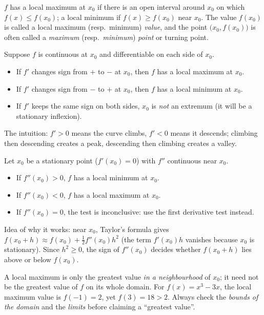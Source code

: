 \documentclass[11pt]{article}
\newcommand{\cle}[1]{{\popxbold\color{popdark}#1}}
\begin{document}
\begin{definition}
$f$ has a \cle{local maximum} at $x_0$ if there is an open interval around $x_0$ on which $f(x) \le f(x_0)$; a \cle{local minimum} if $f(x) \ge f(x_0)$ near $x_0$. The value $f(x_0)$ is called a local maximum (resp.\ minimum) \emph{value}, and the point $\bigl(x_0, f(x_0)\bigr)$ is often called a \emph{maximum} (resp.\ \emph{minimum}) \emph{point} or \cle{turning point}.
\end{definition}

\begin{propriete}
Suppose $f$ is continuous at $x_0$ and differentiable on each side of $x_0$.
\begin{itemize}
\item If $f'$ changes sign from $+$ to $-$ at $x_0$, then $f$ has a \cle{local maximum} at $x_0$.
\item If $f'$ changes sign from $-$ to $+$ at $x_0$, then $f$ has a \cle{local minimum} at $x_0$.
\item If $f'$ keeps the same sign on both sides, $x_0$ is \emph{not} an extremum (it will be a stationary inflexion).
\end{itemize}
The intuition: $f'>0$ means the curve climbs, $f'<0$ means it descends; climbing then descending creates a peak, descending then climbing creates a valley.
\end{propriete}

\begin{propriete}
Let $x_0$ be a stationary point ($f'(x_0)=0$) with $f''$ continuous near $x_0$.
\begin{itemize}
\item If $f''(x_0) > 0$, $f$ has a \cle{local minimum} at $x_0$.
\item If $f''(x_0) < 0$, $f$ has a \cle{local maximum} at $x_0$.
\item If $f''(x_0) = 0$, the test is \cle{inconclusive}: use the first derivative test instead.
\end{itemize}
Idea of why it works: near $x_0$, Taylor's formula gives $f(x_0+h) \approx f(x_0) + \tfrac{1}{2}f''(x_0)h^2$ (the term $f'(x_0)h$ vanishes because $x_0$ is stationary). Since $h^2 \ge 0$, the sign of $f''(x_0)$ decides whether $f(x_0+h)$ lies above or below $f(x_0)$.
\end{propriete}

\begin{attention}
A local maximum is only the greatest value \emph{in a neighbourhood} of $x_0$; it need not be the greatest value of $f$ on its whole domain. For $f(x)=x^3-3x$, the local maximum value is $f(-1)=2$, yet $f(3)=18 > 2$. Always check the \emph{bounds of the domain} and the \emph{limits} before claiming a ``greatest value''.
\end{attention}
\end{document}
